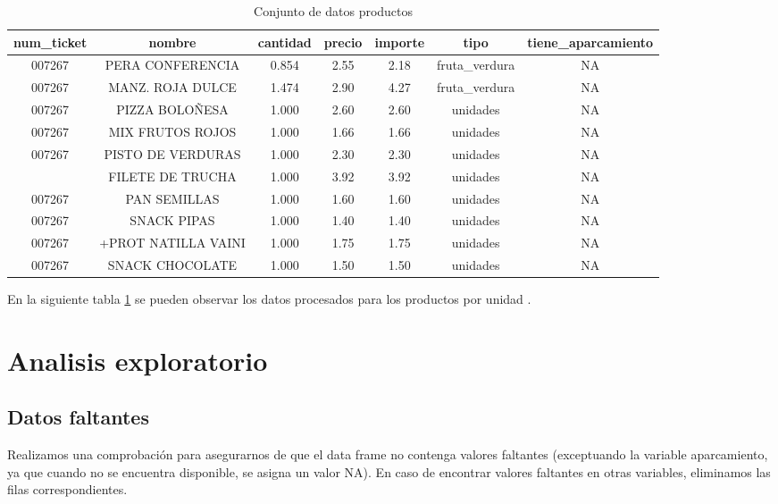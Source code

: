 \documentclass[,article,submit,moreauthors,pdftex]{Definitions/mdpi}
\begin{document}
\begin{table}

\caption{\label{tab:tabla_final}Conjunto de datos productos}
\centering
\begin{tabular}[t]{ccccccc}
\toprule
num\_ticket & nombre & cantidad & precio & importe & tipo & tiene\_aparcamiento\\
\midrule
007267 & PERA CONFERENCIA & 0.854 & 2.55 & 2.18 & fruta\_verdura & NA\\
007267 & MANZ. ROJA DULCE & 1.474 & 2.90 & 4.27 & fruta\_verdura & NA\\
007267 & PIZZA BOLOÑESA & 1.000 & 2.60 & 2.60 & unidades & NA\\
007267 & MIX FRUTOS ROJOS & 1.000 & 1.66 & 1.66 & unidades & NA\\
007267 & PISTO DE VERDURAS & 1.000 & 2.30 & 2.30 & unidades & NA\\
\addlinespace
007267 & FILETE DE TRUCHA & 1.000 & 3.92 & 3.92 & unidades & NA\\
007267 & PAN SEMILLAS & 1.000 & 1.60 & 1.60 & unidades & NA\\
007267 & SNACK PIPAS & 1.000 & 1.40 & 1.40 & unidades & NA\\
007267 & +PROT NATILLA VAINI & 1.000 & 1.75 & 1.75 & unidades & NA\\
007267 & SNACK CHOCOLATE & 1.000 & 1.50 & 1.50 & unidades & NA\\
\bottomrule
\end{tabular}
\end{table}

En la siguiente tabla \ref{tab:tabla_final} se pueden observar los datos
procesados para los productos por unidad .

\hypertarget{analisis-exploratorio}{%
\section{Analisis exploratorio}\label{analisis-exploratorio}}

\hypertarget{datos-faltantes}{%
\subsection{Datos faltantes}\label{datos-faltantes}}

Realizamos una comprobación para asegurarnos de que el data frame no
contenga valores faltantes (exceptuando la variable aparcamiento, ya que
cuando no se encuentra disponible, se asigna un valor NA). En caso de
encontrar valores faltantes en otras variables, eliminamos las filas
correspondientes.
\end{document}
